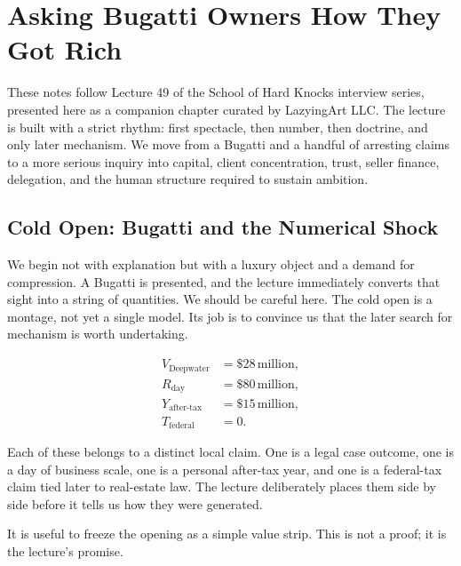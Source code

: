 \chapter{Asking Bugatti Owners How They Got Rich}

These notes follow Lecture 49 of the School of Hard Knocks interview series, presented here as a companion chapter curated by LazyingArt LLC. The lecture is built with a strict rhythm: first spectacle, then number, then doctrine, and only later mechanism. We move from a Bugatti and a handful of arresting claims to a more serious inquiry into capital, client concentration, trust, seller finance, delegation, and the human structure required to sustain ambition.

\section{Cold Open: Bugatti and the Numerical Shock}

We begin not with explanation but with a luxury object and a demand for compression. A Bugatti is presented, and the lecture immediately converts that sight into a string of quantities. We should be careful here. The cold open is a montage, not yet a single model. Its job is to convince us that the later search for mechanism is worth undertaking.

\begin{align}
V_{\text{Deepwater}}&=\$28\,\text{million},\\
R_{\text{day}}&=\$80\,\text{million},\\
Y_{\text{after-tax}}&=\$15\,\text{million},\\
T_{\text{federal}}&=0.
\end{align}

Each of these belongs to a distinct local claim. One is a legal case outcome, one is a day of business scale, one is a personal after-tax year, and one is a federal-tax claim tied later to real-estate law. The lecture deliberately places them side by side before it tells us how they were generated.

It is useful to freeze the opening as a simple value strip. This is not a proof; it is the lecture's promise.

\begin{figure}
\centering
{}
\end{figure}

